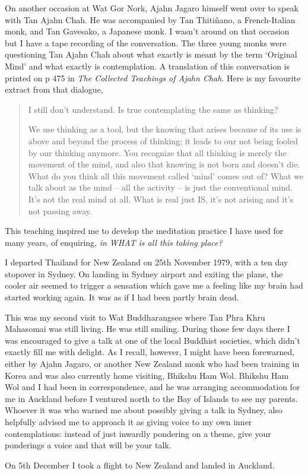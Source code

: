 On another occasion at Wat Gor Nork, Ajahn Jagaro himself went over to
speak with Tan Ajahn Chah. He was accompanied by Tan Thitiñano, a
French-Italian monk, and Tan Gavesako, a Japanese monk. I wasn't around
on that occasion but I have a tape recording of the conversation. The
three young monks were questioning Tan Ajahn Chah about what exactly is
meant by the term `Original Mind' and what exactly is contemplation. A
translation of this conversation is printed on p 475
in \emph{The Collected Teachings of Ajahn Chah}\cite{collected}.
Here is my favourite extract from that dialogue,

\begin{quotation}
 I still don't understand. Is true contemplating the same as thinking?

 We use thinking as a tool, but the knowing that arises
because of its use is above and beyond the process of thinking; it leads
to our not being fooled by our thinking anymore. You recognize that all
thinking is merely the movement of the mind, and also that knowing is
not born and doesn't die. What do you think all this movement called
`mind' comes out of? What we talk about as the mind -- all the activity
-- is just the conventional mind. It's not the real mind at all. What is
real just IS, it's not arising and it's not passing away.
\end{quotation}

This teaching inspired me to develop the meditation practice I have used
for many years, of enquiring, \emph{in WHAT is all this taking place?}

I departed Thailand for New Zealand on 25th November 1979, with a ten
day stopover in Sydney. On landing in Sydney airport and exiting the
plane, the cooler air seemed to trigger a sensation which gave me a
feeling like my brain had started working again. It was as if I had been
partly brain dead.

This was my second visit to Wat Buddharangsee where Tan Phra Khru
Mahasomai was still living. He was still smiling. During those few days
there I was encouraged to give a talk at one of the local Buddhist
societies, which didn't exactly fill me with delight. As I recall,
however, I might have been forewarned, either by Ajahn Jagaro, or
another New Zealand monk who had been training in Korea and was also
currently home visiting, Bhikshu Ham Wol. Bhikshu Ham Wol and I had been
in correspondence, and he was arranging accommodation for me in Auckland
before I ventured north to the Bay of Islands to see my parents. Whoever
it was who warned me about possibly giving a talk in Sydney, also
helpfully advised me to approach it as giving voice to my own inner
contemplations: instead of just inwardly pondering on a theme, give your
ponderings a voice and that will be your talk.

On 5th December I took a flight to New Zealand and landed in Auckland.

